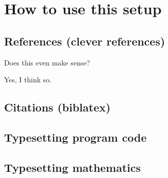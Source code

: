 \chapter{How to use this setup}\label{ch:howtouse}

\section{References (clever references)}
\begin{mychallenge}\label{mychallenge:ok}
	Does this even make sense?
\end{mychallenge}

\begin{myanswer}
	Yes, I think so.
\end{myanswer}

\section{Citations (biblatex)}

\section{Typesetting program code}

\section{Typesetting mathematics}
